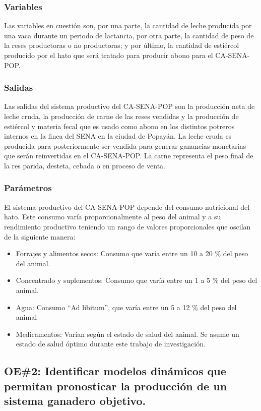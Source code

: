\subsubsection{Variables}
Las variables en cuestión son, por una parte, la cantidad de leche producida por una vaca durante un periodo de lactancia, por otra parte, la cantidad de peso de la reses productoras o no productoras; y por último, la cantidad de estiércol producido por el hato que será tratado para producir abono para el CA-SENA-POP.

\subsubsection{Salidas}

Las salidas del sistema productivo del CA-SENA-POP son la producción neta de leche cruda, la producción de carne de las reses vendidas y la producción de estiércol y materia fecal que es usado como abono en los distintos potreros internos en la finca del SENA en la ciudad de Popayán. La leche cruda es producida para posteriormente ser vendida para generar ganancias monetarias que serán reinvertidas en el CA-SENA-POP. La carne representa el peso final de la res parida, desteta, cebada o en proceso de venta. 

\subsubsection{Parámetros}

El sistema productivo del CA-SENA-POP depende del consumo nutricional del hato. Este consumo varía proporcionalmente al peso del animal y a su rendimiento productivo teniendo un rango de valores proporcionales que oscilan de la siguiente manera:
\begin{itemize}
    \item Forrajes y alimentos secos: Consumo que varía entre un 10 a 20 \% del peso del animal.
    \item Concentrado y suplementos: Consumo que varía entre un 1 a 5 \% del peso del animal.
    \item Agua: Consumo ``Ad libitum'', que varía entre un 5 a 12 \% del peso del animal
    \item Medicamentos: Varían según el estado de salud del animal. Se asume un estado de salud óptimo durante este trabajo de investigación.
\end{itemize}

\subsection{OE\#2: Identificar modelos dinámicos que permitan pronosticar la producción de un sistema ganadero objetivo.}


